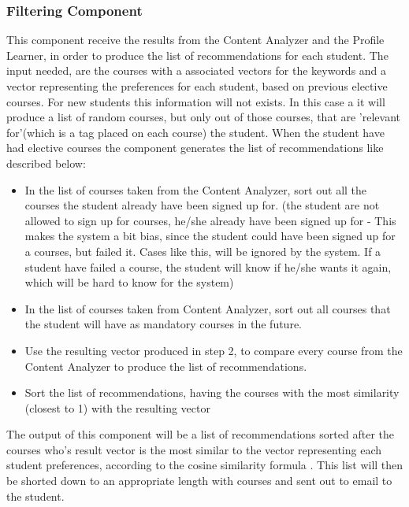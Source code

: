 \subsubsection{Filtering Component}
This component receive the results from the Content Analyzer and the Profile Learner, in order to produce the list of recommendations for each student. The input needed, are the courses with a associated vectors for the keywords and a vector representing the preferences for each student, based on previous elective courses. For new students this information will not exists. In this case a it will produce a list of random courses, but only out of those courses, that are 'relevant for'(which is a tag placed on each course) the student. When the student have had elective courses the component generates the list of recommendations like described below:
\begin{itemize}
	\item In the list of courses taken from the Content Analyzer, sort out all the courses the student already have been signed up for. (the student are not allowed to sign up for courses, he/she already have been signed up for - This makes the system a bit bias, since the student could have been signed up for a courses, but failed it. Cases like this, will be ignored by the system. If a student have failed a course, the student will know if he/she wants it again, which will be hard to know for the system)
	\item In the list of courses taken from Content Analyzer, sort out all courses that the student will have as mandatory courses in the future.
	\item Use the resulting vector produced in step 2, to compare every course from the Content Analyzer to produce the list of recommendations.
	\item Sort the list of recommendations, having the courses with the most similarity (closest to 1) with the resulting vector 
\end{itemize}
The output of this component will be a list of recommendations sorted after the courses who's result vector is the most similar to the vector representing each student preferences, according to the cosine similarity formula . This list will then be shorted down to an appropriate length with courses and sent out to email to the student. 


